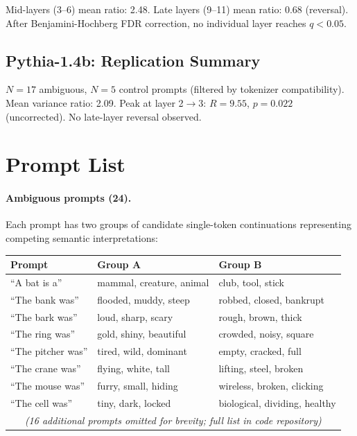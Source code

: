 \documentclass[11pt,a4paper]{article}
\begin{document}
Mid-layers (3--6) mean ratio: 2.48. Late layers (9--11) mean ratio: 0.68 (reversal). After Benjamini-Hochberg FDR correction, no individual layer reaches $q < 0.05$.

\subsection{Pythia-1.4b: Replication Summary}

$N = 17$ ambiguous, $N = 5$ control prompts (filtered by tokenizer compatibility). Mean variance ratio: 2.09. Peak at layer 2$\to$3: $R = 9.55$, $p = 0.022$ (uncorrected). No late-layer reversal observed.

\section{Prompt List}
\label{app:prompts}

\paragraph{Ambiguous prompts (24).} Each prompt has two groups of candidate single-token continuations representing competing semantic interpretations:

\begin{center}
\small
\begin{tabular}{p{3.5cm}p{3.5cm}p{3.5cm}}
\toprule
Prompt & Group A & Group B \\
\midrule
``A bat is a'' & mammal, creature, animal & club, tool, stick \\
``The bank was'' & flooded, muddy, steep & robbed, closed, bankrupt \\
``The bark was'' & loud, sharp, scary & rough, brown, thick \\
``The ring was'' & gold, shiny, beautiful & crowded, noisy, square \\
``The pitcher was'' & tired, wild, dominant & empty, cracked, full \\
``The crane was'' & flying, white, tall & lifting, steel, broken \\
``The mouse was'' & furry, small, hiding & wireless, broken, clicking \\
``The cell was'' & tiny, dark, locked & biological, dividing, healthy \\
\multicolumn{3}{c}{\textit{(16 additional prompts omitted for brevity; full list in code repository)}} \\
\bottomrule
\end{tabular}
\end{center}
\end{document}
